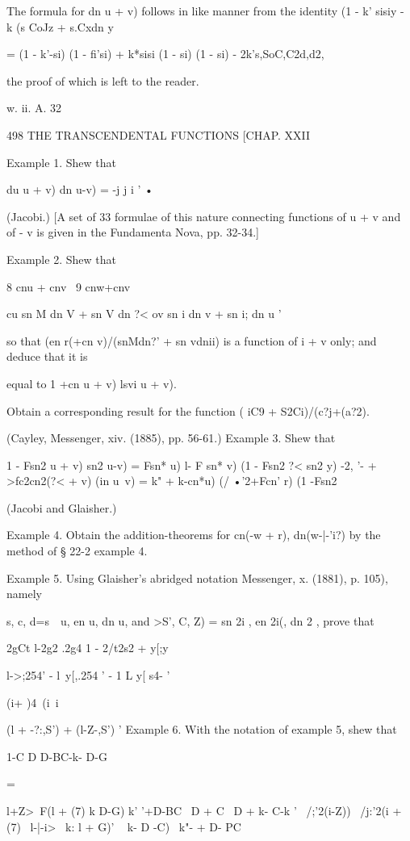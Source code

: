 The formula for dn u + v) follows in like manner from the identity (1
- k' sisiy - k (s CoJz + s.Cxdn y

= (1 - k'-si) (1 - fi'si) + k*sisi (1 - si) (1 - si) -
2k's,SoC,C2d,d2,

the proof of which is left to the reader.

w. ii. A. 32

498 THE TRANSCENDENTAL FUNCTIONS [CHAP. XXII

Example 1. Shew that

du u + v) dn u-v) = -j j i ' •

(Jacobi.) [A set of 33 formulae of this nature connecting functions of
u + v and of - v is given in the Fundamenta Nova, pp. 32-34.]

Example 2. Shew that

8 cnu + cnv \ 9 cnw+cnv

cu sn M dn V + sn V dn ?< ov sn i dn v + sn i; dn u '

so that (en r(+cn v)/(snMdn?' + sn vdnii) is a function of i + v only;
and deduce that it is

equal to 1 +cn u + v) lsvi u + v).

Obtain a corresponding result for the function ( iC9 +
S2Ci)/(c?j+(a?2).

(Cayley, Messenger, xiv. (1885), pp. 56-61.) Example 3. Shew that

1 - Fsn2 u + v) sn2 u-v) = Fsn* u) l- F sn* v) (1 - Fsn2 ?< sn2 y) -2,
'- + >fc2cn2(?< + v) (in u~v) = k" + k-cn*u) (/ •'2+Fcn' r) (1
-Fsn2%

(Jacobi and Glaisher.)

Example 4. Obtain the addition-theorems for cn(-w + r), dn(w-|-'i?) by
the method of § 22-2 example 4.

Example 5. Using Glaisher's abridged notation Messenger, x. (1881), p.
105), namely

s, c, d=s\ \ u, en u, dn u, and >S', C, Z) = sn 2i , en 2i(, dn 2 ,
prove that

2gCt l-2g2 .2g4 1 - 2/t2s2 + y[;y

l->;254' - l\ y[,.254 ' - 1 L y[ s4- '

(i+ )4\ (i\ i

(l + -?:,S') + (l-Z-,S') ' Example 6. With the notation of example 5,
shew that

1-C D D-BC-k- D-G

   =

l+Z>~F(l + (7) k D-G) k' '+D-BC \ D + C \ D + k- C-k ' \ /;'2(i-Z)) \
/j:'2(i + (7) ~l-|-i>~ k: l + G)' ~ k- D -C)~ k"- + D- PC

